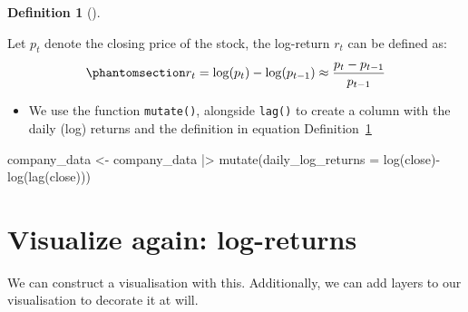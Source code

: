 \documentclass[
  12pt]{article}
\newenvironment{Shaded}{\begin{snugshade}}{\end{snugshade}}
\newcommand{\AttributeTok}[1]{\textcolor[rgb]{0.40,0.45,0.13}{#1}}
\newcommand{\FunctionTok}[1]{\textcolor[rgb]{0.28,0.35,0.67}{#1}}
\newcommand{\NormalTok}[1]{\textcolor[rgb]{0.00,0.23,0.31}{#1}}
\newcommand{\OtherTok}[1]{\textcolor[rgb]{0.00,0.23,0.31}{#1}}
\newcommand{\SpecialCharTok}[1]{\textcolor[rgb]{0.37,0.37,0.37}{#1}}
\providecommand{\tightlist}{%
  \setlength{\itemsep}{0pt}\setlength{\parskip}{0pt}}\usepackage{longtable,booktabs,array}
\theoremstyle{definition}
\newtheorem{definition}{Definition}[section]
\theoremstyle{remark}
\begin{document}
\begin{definition}[]\protect\hypertarget{def-log-returns}{}\label{def-log-returns}

Let \(p_t\) denote the closing price of the stock, the log-return
\(r_t\) can be defined as:
\begin{equation}\phantomsection\label{eq-return-definition}{
r_t = \log(p_t) - \log(p_{t-1}) \approx \frac{p_t - p_{t-1}}{p_{t-1}}
}\end{equation}

\end{definition}

\begin{itemize}
\tightlist
\item
  We use the function \texttt{mutate()}, alongside \texttt{lag()} to
  create a column with the daily (log) returns and the definition in
  equation Definition~\ref{def-log-returns}
\end{itemize}

\begin{Shaded}
\begin{Highlighting}[]
\NormalTok{company\_data }\OtherTok{\textless{}{-}}\NormalTok{ company\_data }\SpecialCharTok{|\textgreater{}} 
  \FunctionTok{mutate}\NormalTok{(}\AttributeTok{daily\_log\_returns =} \FunctionTok{log}\NormalTok{(close)}\SpecialCharTok{{-}}\FunctionTok{log}\NormalTok{(}\FunctionTok{lag}\NormalTok{(close)))}
\end{Highlighting}
\end{Shaded}

\section{Visualize again:
log-returns}\label{visualize-again-log-returns}

We can construct a visualisation with this. Additionally, we can add
layers to our visualisation to decorate it at will.
\end{document}
